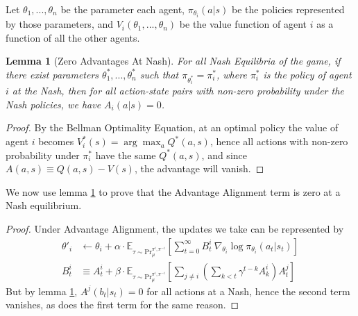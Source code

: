 \documentclass{article} \usepackage{iclr2025_conference,times}
\newtheorem{lemma}{Lemma}
\begin{document}
Let $\theta_1, ... , \theta_n$ be the parameter each agent, $\pi_{\theta_i}(a|s)$ be the policies represented by those parameters, and $V_i(\theta_1, ... , \theta_n)$ be the value function of agent $i$ as a function of all the other agents.
\\
\begin{lemma}[Zero Advantages At Nash]
\label{lm:zero_advantages}
For all Nash Equilibria of the game, if there exist parameters $\theta_1^*, ... , \theta_n^*$ such that $\pi_{\theta_i^*} = \pi_i^*$, where $\pi_i^*$ is the policy of agent $i$ at the Nash, then for all action-state pairs with non-zero probability under the Nash policies, we have $A_i(a|s) = 0$.
\end{lemma}

\begin{proof}
By the Bellman Optimality Equation, at an optimal policy the value of agent $i$ becomes $V_i^*(s) = \arg \max_a Q^*(a,s)$, hence all actions with non-zero probability under $\pi_i^*$ have the same $Q^*(a,s)$, and since $A(a,s) \equiv Q(a,s)-V(s)$, the advantage will vanish. 
\end{proof}

We now use lemma \ref{lm:zero_advantages} to prove that the Advantage Alignment term is zero at a Nash equilibrium.

\begin{proof}
Under Advantage Alignment, the updates we take can be represented by
\begin{align}
    \theta'_i &\leftarrow \theta_i + \alpha \cdot \mathbb{E}_{\tau \sim \text{Pr}_{\mu}^{\pi^i, \pi^{-i}}} \left[\sum_{t=0}^\infty B^i_t \: \nabla_{\theta_i} \log \pi_{\theta_i}(a_t | s_t)\right]\\
    B^i_t &\equiv A^i_t + \beta \cdot \mathbb{E}_{\tau \sim \text{Pr}_{\mu}^{\pi^i, \pi^{-i}}} \left[\sum_{j\neq i}  \left(\sum_{k<t} \gamma^{t-k} A^{i}_k \right)A^j_t \right]
\end{align}
But by lemma \ref{lm:zero_advantages}, $A^j(b_{t}|s_{t}) = 0$ for all actions at a Nash, hence the second term vanishes, as does the first term for the same reason. 
\end{proof}
\end{document}
